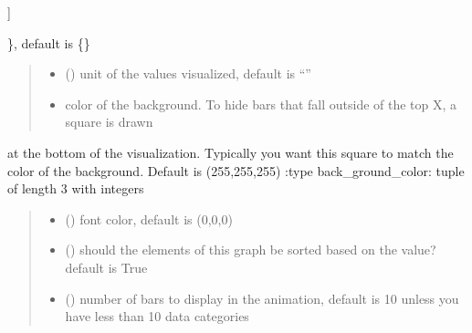 \documentclass[letterpaper,10pt,english]{sphinxmanual}
\begin{document}
\begin{fulllineitems}
\begin{description}
\begin{description}
\begin{description}
\end{description}

\sphinxAtStartPar
{]}

\end{description}

\sphinxAtStartPar
\}, default is \{\}

\end{description}
\begin{quote}\begin{description}
\begin{itemize}
\item {} 
\sphinxAtStartPar
{} () \textendash{} unit of the values visualized, default is “”

\item {} 
\sphinxAtStartPar
{} \textendash{} color of the background. To hide bars that fall outside of the top X, a square is drawn

\end{itemize}

\end{description}\end{quote}

\sphinxAtStartPar
at the bottom of the visualization. Typically you want this square to match the color of the background. Default is (255,255,255)
:type back\_ground\_color: tuple of length 3 with integers
\begin{quote}\begin{description}
\begin{itemize}
\item {} 
\sphinxAtStartPar
{} () \textendash{} font color, default is (0,0,0)

\item {} 
\sphinxAtStartPar
{} () \textendash{} should the elements of this graph be sorted based on the value? default is True

\item {} 
\sphinxAtStartPar
{} () \textendash{} number of bars to display in the animation, default is 10 unless you have less than 10 data categories


\end{itemize}
\end{description}
\end{quote}
\end{fulllineitems}
\end{document}

